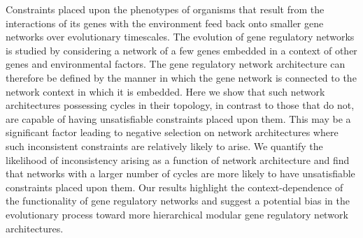 Constraints placed upon the phenotypes of organisms that result from the interactions of its genes with the environment feed back onto smaller gene networks over evolutionary timescales. The evolution of gene regulatory networks is studied by considering a network of a few genes embedded in a context of other genes and environmental factors.  The gene regulatory network architecture can therefore be defined by the manner in which the gene network is connected to the network context in which it is embedded. Here we show that such network architectures possessing cycles in their topology, in contrast to those that do not, are capable of having unsatisfiable constraints placed upon them. This may be a significant factor leading to negative selection on network architectures where such inconsistent constraints are relatively likely to arise. We quantify the likelihood of inconsistency arising as a function of network architecture and find that networks with a larger number of cycles are more likely to have unsatisfiable constraints placed upon them. Our results highlight the context-dependence of the functionality of gene regulatory networks and suggest a potential bias in the evolutionary process toward more hierarchical modular gene regulatory network architectures.

